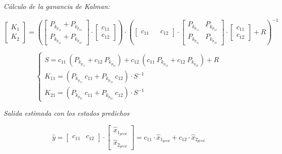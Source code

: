 \textit{Cálculo de la ganancia de Kalman:}

\vspace{-0.5cm}
\begin{equation}
    \begin{bmatrix}
        K_{1} \\
        K_{2}
    \end{bmatrix}
    =
    \left(
    \begin{bmatrix}
        P_{k_{p_{11}}} + P_{k_{p_{12}}} \\
        P_{k_{p_{21}}} + P_{k_{p_{22}}}
    \end{bmatrix}
    \cdot
    \begin{bmatrix}
        c_{11} \\
        c_{12}
    \end{bmatrix}
    \right)
    \cdot
    \left(
    \begin{bmatrix}
        c_{11} && c_{12}
    \end{bmatrix}
    \cdot
    \begin{bmatrix}
        P_{k_{p_{11}}} & P_{k_{p_{12}}} \\
        P_{k_{p_{21}}} & P_{k_{p_{22}}}
    \end{bmatrix}
    \cdot
    \begin{bmatrix}
        c_{11} \\
        c_{12}
    \end{bmatrix}
    +
    R
    \right)^{-1}
\end{equation}
\vspace{-0.5cm}

\vspace{-0.5cm}
\begin{equation}
    \begin{cases}
        S = c_{11}\ (P_{k_{p_{11}}} + c_{12}\ P_{k_{p_{21}}}) + c_{12}\ (c_{11}\ P_{k_{p_{12}}} + c_{12}\ P_{k_{p_{22}}}) + R
        \\
        K_{11} = (P_{k_{p_{11}}}\ c_{11} + P_{k_{p_{12}}}\ c_{12}) \cdot S^{-1} 
        \\
        K_{21} = (P_{k_{p_{21}}}\ c_{11} + P_{k_{p_{22}}}\ c_{12}) \cdot S^{-1}
    \end{cases}
\end{equation}
\vspace{-0.5cm}

\textit{Salida estimada con los estados predichos}

\vspace{-0.5cm}
\begin{equation}
    \hat{y} =
    \begin{bmatrix}
        c_{11} & c_{12}
    \end{bmatrix}
    \cdot
    \begin{bmatrix}
        \hat{x}_{1_{pred}} \\
        \hat{x}_{2_{pred}}
    \end{bmatrix}
    =
    c_{11} \cdot \hat{x}_{1_{pred}} + c_{12} \cdot \hat{x}_{2_{pred}}
\end{equation}
\vspace{-0.5cm}

